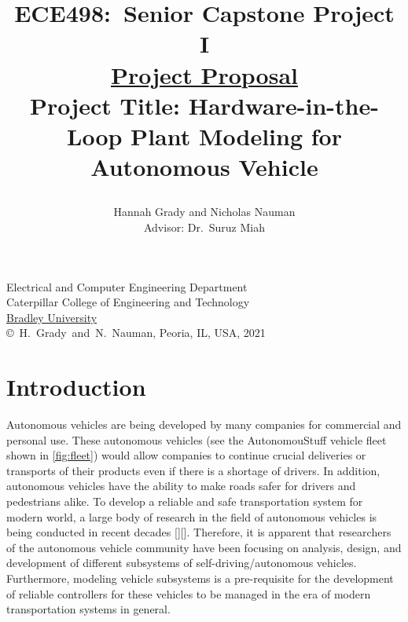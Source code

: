\documentclass[letterpaper,12pt]{article}   %
\title{ECE498:~Senior Capstone Project I\\\textbf{\underline{Project Proposal}}\\
\vspace{0.5in}
Project Title: Hardware-in-the-Loop Plant Modeling for Autonomous Vehicle 
\vspace{1.0in}
\author{Hannah Grady and Nicholas Nauman\\ Advisor: Dr.~Suruz Miah}
}
\date{}  %
\begin{document}
\begin{titlepage}
  \maketitle

  \vspace*{4.0cm}
  \begin{center}
    \normalsize
    Electrical and Computer Engineering Department\\
    Caterpillar College of Engineering and Technology\\
\href{http://www.bradley.edu/}{Bradley University}\\

\vspace*{3.0cm}
\copyright~H.~Grady~and~N.~Nauman, Peoria, IL, USA, 2021\\

\end{center}
\thispagestyle{empty}

\end{titlepage} 
\newpage
\renewcommand{\contentsname}{Table of Contents}
\tableofcontents
\newpage

\section{Introduction}
Autonomous vehicles are being developed by many companies for commercial and
personal use. These autonomous vehicles (see the AutonomouStuff vehicle fleet
shown in \autoref{fig:fleet}) would allow companies to continue crucial deliveries
or transports of their products even if there is a shortage of drivers. In
addition, autonomous vehicles have the ability to make roads safer for drivers
and pedestrians alike. To develop a reliable and safe transportation system for
modern world, a large body of research in the field of autonomous vehicles is
being conducted in recent decades [][].
Therefore, it is apparent that researchers of the autonomous vehicle community
have been focusing on analysis, design, and development of different subsystems
of self-driving/autonomous vehicles. Furthermore, modeling vehicle subsystems is
a pre-requisite for the development of reliable controllers for these vehicles
to be managed in the era of modern transportation systems in general.
\end{document}
